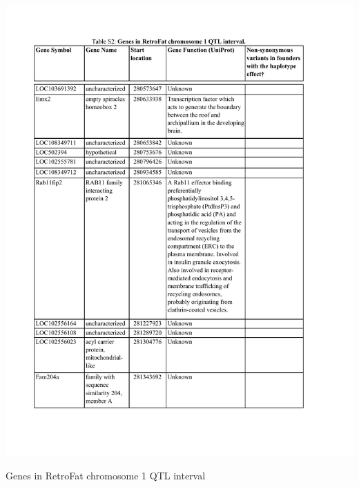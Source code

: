 \begin{table}
\centering
\includegraphics[page=1, trim={0in 0in 0in 0.95in}, clip, width=\textwidth]{figures/5-hsrats/supp_table_retrofat_chr1.pdf}
\caption{Genes in RetroFat chromosome 1 QTL interval \label{tab:retrofat_chr1_genes_1}}
\end{table}

\clearpage

